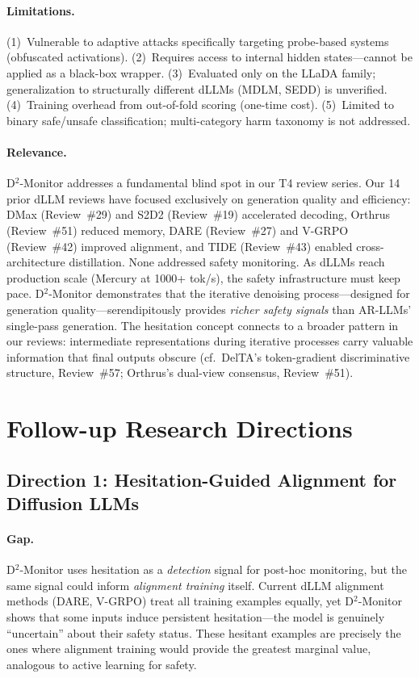 \documentclass[11pt,a4paper]{article}
\begin{document}
\paragraph{Limitations.}
(1)~Vulnerable to adaptive attacks specifically targeting probe-based systems (obfuscated activations). (2)~Requires access to internal hidden states---cannot be applied as a black-box wrapper. (3)~Evaluated only on the LLaDA family; generalization to structurally different dLLMs (MDLM, SEDD) is unverified. (4)~Training overhead from out-of-fold scoring (one-time cost). (5)~Limited to binary safe/unsafe classification; multi-category harm taxonomy is not addressed.

\paragraph{Relevance.}
D$^2$-Monitor addresses a fundamental blind spot in our T4 review series. Our 14 prior dLLM reviews have focused exclusively on generation quality and efficiency: DMax (Review~\#29) and S2D2 (Review~\#19) accelerated decoding, Orthrus (Review~\#51) reduced memory, DARE (Review~\#27) and V-GRPO (Review~\#42) improved alignment, and TIDE (Review~\#43) enabled cross-architecture distillation. None addressed safety monitoring. As dLLMs reach production scale (Mercury at 1000+ tok/s), the safety infrastructure must keep pace. D$^2$-Monitor demonstrates that the iterative denoising process---designed for generation quality---serendipitously provides \emph{richer safety signals} than AR-LLMs' single-pass generation. The hesitation concept connects to a broader pattern in our reviews: intermediate representations during iterative processes carry valuable information that final outputs obscure (cf.\ DelTA's token-gradient discriminative structure, Review~\#57; Orthrus's dual-view consensus, Review~\#51).

\section*{Follow-up Research Directions}

\subsection*{Direction 1: Hesitation-Guided Alignment for Diffusion LLMs}

\paragraph{Gap.}
D$^2$-Monitor uses hesitation as a \emph{detection} signal for post-hoc monitoring, but the same signal could inform \emph{alignment training} itself. Current dLLM alignment methods (DARE, V-GRPO) treat all training examples equally, yet D$^2$-Monitor shows that some inputs induce persistent hesitation---the model is genuinely ``uncertain'' about their safety status. These hesitant examples are precisely the ones where alignment training would provide the greatest marginal value, analogous to active learning for safety.
\end{document}
